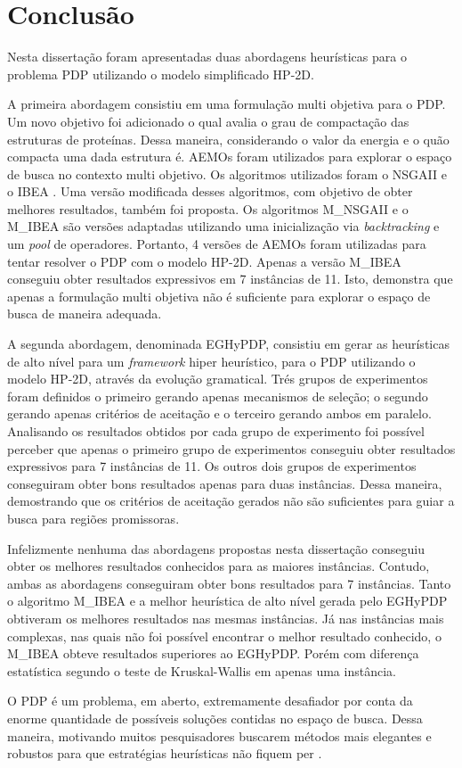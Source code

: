 \chapter{Conclusão}


Nesta dissertação foram apresentadas duas abordagens heurísticas para o problema PDP utilizando o modelo simplificado HP-2D. 

A primeira abordagem consistiu em uma formulação multi objetiva para o PDP. Um novo objetivo foi adicionado o qual avalia o grau de compactação das estruturas de proteínas. Dessa maneira, considerando o valor da energia e o quão compacta uma dada estrutura é. AEMOs foram utilizados para explorar o espaço de busca no contexto multi objetivo. Os algoritmos utilizados foram o NSGAII \cite{deb2002} e o IBEA \cite{zitzler2004indicator}. Uma versão modificada desses algoritmos, com objetivo de obter melhores resultados, também foi proposta. Os algoritmos M\_NSGAII e o M\_IBEA são versões adaptadas utilizando uma inicialização via \textit{backtracking}  e um \textit{pool} de operadores. Portanto, 4 versões de AEMOs foram utilizadas para tentar resolver o PDP com o modelo HP-2D. Apenas a versão M\_IBEA conseguiu obter resultados expressivos em 7 instâncias de 11. Isto, demonstra que apenas a formulação multi objetiva não é suficiente para explorar o espaço de busca de maneira adequada.  


A segunda abordagem, denominada EGHyPDP, consistiu em gerar as heurísticas de alto nível para um \textit{framework} hiper heurístico, para o PDP utilizando o modelo HP-2D, através da evolução gramatical. Trés grupos de experimentos foram definidos o primeiro gerando apenas mecanismos de seleção; o segundo gerando apenas critérios de aceitação e o terceiro gerando ambos em paralelo. Analisando os resultados obtidos por cada grupo de experimento foi possível perceber que apenas o primeiro grupo de experimentos conseguiu obter resultados expressivos para 7 instâncias de 11. Os outros dois grupos de experimentos conseguiram obter bons resultados apenas para duas instâncias. Dessa maneira, demostrando que os critérios de aceitação gerados não são suficientes para guiar a busca para regiões promissoras. 

Infelizmente nenhuma das abordagens propostas nesta dissertação conseguiu obter os melhores resultados conhecidos para as maiores instâncias. Contudo, ambas as abordagens conseguiram obter bons resultados para 7 instâncias. Tanto o algoritmo M\_IBEA e a melhor heurística de alto nível gerada pelo EGHyPDP obtiveram os melhores resultados nas mesmas instâncias. Já nas instâncias mais complexas, nas quais não foi possível encontrar o melhor resultado conhecido, o M\_IBEA obteve resultados superiores ao EGHyPDP. Porém com diferença estatística segundo o teste de Kruskal-Wallis em apenas uma instância.

O PDP é um problema, em aberto,  extremamente desafiador por conta da enorme quantidade de possíveis soluções contidas no espaço de busca. Dessa maneira,  motivando muitos pesquisadores buscarem métodos mais elegantes e robustos para que estratégias heurísticas não fiquem per .



